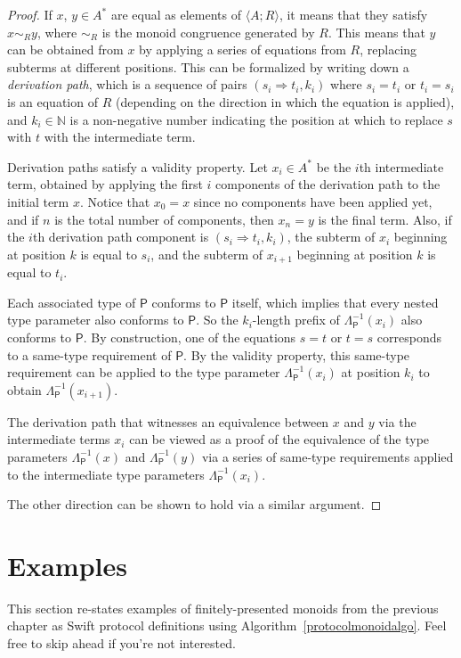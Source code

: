 \documentclass[a4paper,headsepline,bibliography=totoc,toc=flat,fleqn,twoside=semi]{scrbook}
\theoremstyle{definition}
\theoremstyle{definition}
\theoremstyle{definition}
\newcommand{\proto}[1]{\bm{\mathsf{#1}}}
\begin{document}
\begin{proof}
If $x$, $y\in A^*$ are equal as elements of $\langle A;R\rangle$, it means that they satisfy $x\sim_R y$, where $\sim_R$ is the monoid congruence generated by $R$. This means that $y$ can be obtained from $x$ by applying a series of equations from $R$, replacing subterms at different positions.
This can be formalized by writing down a \emph{derivation path}, which is a sequence of pairs $(s_i \Rightarrow t_i, k_i)$ where $s_i=t_i$ or $t_i=s_i$ is an equation of $R$ (depending on the direction in which the equation is applied), and $k_i\in\mathbb{N}$ is a non-negative number indicating the position at which to replace $s$ with $t$ with the intermediate term.

Derivation paths satisfy a validity property. Let $x_i\in A^*$ be the $i$th intermediate term, obtained by applying the first $i$ components of the derivation path to the initial term $x$. Notice that $x_0=x$ since no components have been applied yet, and if $n$ is the total number of components, then $x_n=y$ is the final term. Also, if the $i$th derivation path component is $(s_i\Rightarrow t_i, k_i)$, the subterm of $x_i$ beginning at position $k$ is equal to $s_i$, and the subterm of $x_{i+1}$ beginning at position $k$ is equal to $t_i$.

Each associated type of $\proto{P}$ conforms to $\proto{P}$ itself, which implies that every nested type parameter also conforms to $\proto{P}$. So the $k_i$-length prefix of $\Lambda_{\proto{P}}^{-1}(x_i)$ also conforms to $\proto{P}$. By construction, one of the equations $s=t$ or $t=s$ corresponds to a same-type requirement of $\proto{P}$. By the validity property, this same-type requirement can be applied to the type parameter $\Lambda_{\proto{P}}^{-1}(x_i)$ at position $k_i$ to obtain $\Lambda_{\proto{P}}^{-1}(x_{i+1})$.

The derivation path that witnesses an equivalence between $x$ and $y$ via the intermediate terms $x_i$ can be viewed as a proof of the equivalence of the type parameters $\Lambda_{\proto{P}}^{-1}(x)$ and $\Lambda_{\proto{P}}^{-1}(y)$ via a series of same-type requirements applied to the intermediate type parameters $\Lambda_{\proto{P}}^{-1}(x_i)$.

The other direction can be shown to hold via a similar argument.
\end{proof}
\section{Examples}
This section re-states examples of finitely-presented monoids from the previous chapter as Swift protocol definitions using Algorithm~\ref{protocolmonoidalgo}. Feel free to skip ahead if you're not interested.
\end{document}
